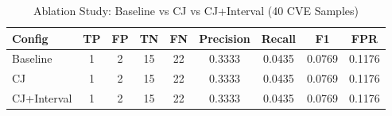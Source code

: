 \begin{table}[htbp]
\centering
\caption{Ablation Study: Baseline vs CJ vs CJ+Interval (40 CVE Samples)}
\label{tab:ablation-interval}
\begin{tabular}{lcccccccc}
\toprule
Config & TP & FP & TN & FN & Precision & Recall & F1 & FPR \\
\midrule
Baseline & 1 & 2 & 15 & 22 & 0.3333 & 0.0435 & 0.0769 & 0.1176 \\
CJ & 1 & 2 & 15 & 22 & 0.3333 & 0.0435 & 0.0769 & 0.1176 \\
CJ+Interval & 1 & 2 & 15 & 22 & 0.3333 & 0.0435 & 0.0769 & 0.1176 \\
\bottomrule
\end{tabular}
\end{table}